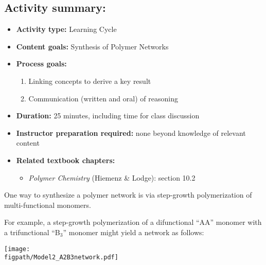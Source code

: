 \begin{activity}
\begin{instructornotes}
	\subsection*{Activity summary:}
	\begin{itemize}
		\item \textbf{Activity type:} Learning Cycle
		\item \textbf{Content goals:} Synthesis of Polymer Networks
		\item \textbf{Process goals:} %
			\begin{enumerate}
				\item Linking concepts to derive a key result
				\item Communication (written and oral) of reasoning
			\end{enumerate}
		\item \textbf{Duration:} 25 minutes, including time for class discussion
		\item \textbf{Instructor preparation required:} none beyond knowledge of relevant content
		\item \textbf{Related textbook chapters:}
			\begin{itemize}
				\item \emph{Polymer Chemistry} (Hiemenz \& Lodge): section 10.2
			\end{itemize}
	\end{itemize}
	
\end{instructornotes}

\begin{model}

	One way to synthesize a polymer network is via step-growth polymerization of multi-functional monomers.
	
	For example, a step-growth polymerization of a difunctional ``AA'' monomer with a trifunctional ``B$_3$'' monomer might yield a network as follows:
	
	\centerline{\texttt{[image: \\figpath/Model2\_A2B3network.pdf]}}

\end{model}


\end{activity}
